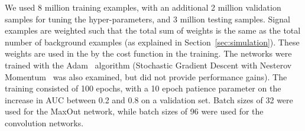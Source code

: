 We used 8 million training examples, with an additional 2 million validation samples for tuning the hyper-parameters, and 3 million testing samples.  Signal examples are weighted such that the total sum of weights is the same as the total number of background examples (as explained in Section~\ref{sec:simulation}).  These weights are used in the by the cost function in the training.  The networks were trained with the Adam~\cite{DBLP:journals/corr/KingmaB14} algorithm (Stochastic Gradient Descent with Nesterov Momentum~\cite{Nesterov:1983wy} was also examined, but did not provide performance gains).  The training consisted of 100 epochs, with a 10 epoch patience parameter on the increase in AUC between 0.2 and 0.8 on a validation set.  Batch sizes of 32 were used for the MaxOut network, while batch sizes of 96 were used for the convolution networks.


